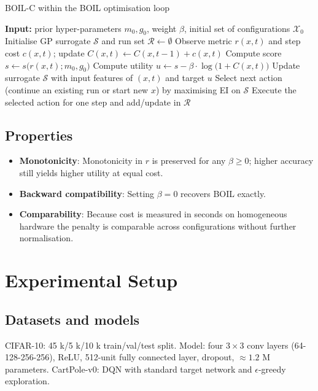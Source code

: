 \documentclass{article} %
\begin{document}
\begin{algorithm}
\caption{BOIL-C within the BOIL optimisation loop}
\begin{algorithmic}
  \State \textbf{Input:} prior hyper-parameters \(m_0,g_0\), weight \(\beta\), initial set of configurations \(\mathcal{X}_0\)
  \State Initialise GP surrogate \(\mathcal{S}\) and run set \(\mathcal{R}\leftarrow\emptyset\)
      \State Observe metric \(r(x,t)\) and step cost \(c(x,t)\); update \(C(x,t)\leftarrow C(x,t-1)+c(x,t)\)
      \State Compute score \(s\leftarrow s\big(r(x,t); m_0,g_0\big)\)
      \State Compute utility \(u\leftarrow s - \beta\cdot \log\big(1+C(x,t)\big)\)
      \State Update surrogate \(\mathcal{S}\) with input features of \((x,t)\) and target \(u\)
    \EndFor
    \State Select next action (continue an existing run or start new \(x\)) by maximising EI on \(\mathcal{S}\)
    \State Execute the selected action for one step and add/update in \(\mathcal{R}\)
  \EndWhile
\end{algorithmic}
\end{algorithm}

\subsection{Properties}
\begin{itemize}
  \item \textbf{Monotonicity}: Monotonicity in \(r\) is preserved for any \(\beta\ge 0\); higher accuracy still yields higher utility at equal cost.
  \item \textbf{Backward compatibility}: Setting \(\beta=0\) recovers BOIL exactly.
  \item \textbf{Comparability}: Because cost is measured in seconds on homogeneous hardware the penalty is comparable across configurations without further normalisation.
\end{itemize}

\section{Experimental Setup}
\label{sec:experimental}
\subsection{Datasets and models}
CIFAR-10: 45 k/5 k/10 k train/val/test split. Model: four \(3\times 3\) conv layers (64-128-256-256), ReLU, 512-unit fully connected layer, dropout, \(\approx 1.2\) M parameters. CartPole-v0: DQN with standard target network and \(\epsilon\)-greedy exploration.
\end{document}
